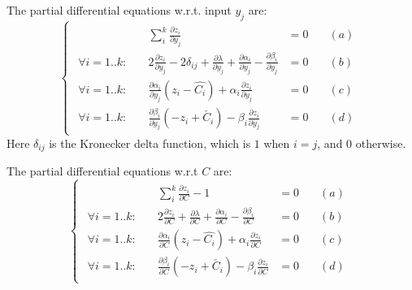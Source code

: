 \documentclass[11 pt]{article}
\begin{document}
The partial differential equations w.r.t. input $y_j$ are:
\begin{equation}\label{eqns_wrt_y_j}
    \begin{cases}
        \begin{aligned}
            & \sum_i^k \frac{\partial z_i}{\partial y_j} & = 0 &\quad (a)\\
            
            \forall i=1..k : \quad & 2\frac{\partial z_i}{\partial y_j} - 2\delta_{ij} + \frac{\partial \lambda}{\partial y_j} + \frac{\partial \alpha_i}{\partial y_j} - \frac{\partial \beta_i}{\partial y_j} & = 0 &\quad (b)\\
            
            \forall i=1..k : \quad & \frac{\partial \alpha_i}{\partial y_j}(z_i - \hat{C_i}) + \alpha_i \frac{\partial z_i}{\partial y_j} & = 0 &\quad (c)\\
            
            \forall i=1..k : \quad & \frac{\partial \beta_i}{\partial y_j}(-z_i + \check{C_i}) - \beta_i \frac{\partial z_i}{\partial y_j}& = 0 &\quad (d)
        \end{aligned}
    \end{cases}
\end{equation}
Here $\delta_{ij}$ is the Kronecker delta function, which is $1$ when $i=j$, and $0$ otherwise.

The partial differential equations w.r.t $C$ are:
\begin{equation}\label{eqns_wrt_C}
    \begin{cases}
        \begin{aligned}
            & \sum_i^k \frac{\partial z_i}{\partial C} - 1 & = 0 &\quad (a)\\
            
            \forall i=1..k : \quad & 2\frac{\partial z_i}{\partial C} + \frac{\partial \lambda}{\partial C} + \frac{\partial \alpha_i}{\partial C} - \frac{\partial \beta_i}{\partial C} & = 0 &\quad (b) \\
            
            \forall i=1..k : \quad & \frac{\partial \alpha_i}{\partial C}(z_i - \hat{C_i}) + \alpha_i \frac{\partial z_i}{\partial C} & = 0 &\quad (c) \\
            
            \forall i=1..k : \quad & \frac{\partial \beta_i}{\partial C}(-z_i + \check{C_i}) - \beta_i \frac{\partial z_i}{\partial C}& = 0 &\quad (d)
        \end{aligned}
    \end{cases}
\end{equation}
\end{document}

